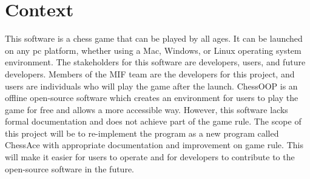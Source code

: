 \documentclass[12pt,letterpaper]{article}
\begin{document}
\section{Context}
This software is a chess game that can be played by all ages. It can be launched on any pc platform, whether using a Mac, Windows, or Linux operating system environment. The stakeholders for this software are developers, users, and future developers. Members of the MIF team are the developers for this project, and users are individuals who will play the game after the launch. 
\medskip
\newline
ChessOOP is an offline open-source software which creates an environment for users to play the game for free and allows a more accessible way. However, this software lacks formal documentation and does not achieve part of the game rule. The scope of this project will be to re-implement the program as a new program called ChessAce with appropriate documentation and improvement on game rule. This will make it easier for users to operate and for developers to contribute to the open-source software in the future.

\end{document}

